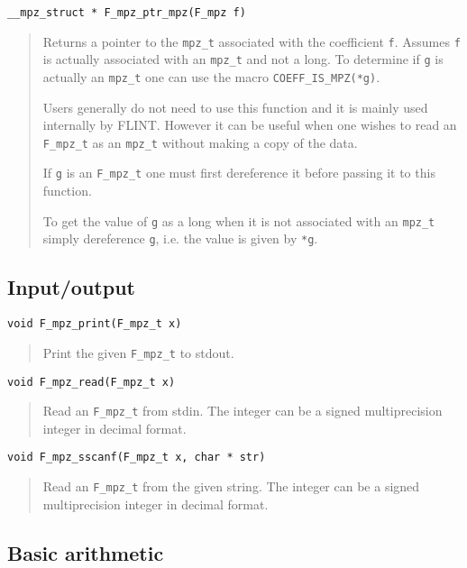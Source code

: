 \documentclass[a4paper,10pt]{article}
\newcommand{\code}{\lstinline}
\begin{document}
\begin{lstlisting}
__mpz_struct * F_mpz_ptr_mpz(F_mpz f)
\end{lstlisting}
\begin{quote}
Returns a pointer to the \code{mpz_t} associated with the coefficient \code{f}. Assumes \code{f} is actually associated with an \code{mpz_t} and not a long. To determine if \code{g} is actually an \code{mpz_t} one can use the macro \code{COEFF_IS_MPZ(*g)}.

Users generally do not need to use this function and it is mainly used internally by FLINT. However it can be useful when one wishes to read an \code{F_mpz_t} as an \code{mpz_t} without making a copy of the data. 

If \code{g} is an \code{F_mpz_t} one must first dereference it before passing it to this function. 

To get the value of \code{g} as a long when it is not associated with an \code{mpz_t} simply dereference \code{g}, i.e. the value is given by \code{*g}.
\end{quote}

\subsection{Input/output}

\begin{lstlisting}
void F_mpz_print(F_mpz_t x)
\end{lstlisting}
\begin{quote}
Print the given \code{F_mpz_t} to stdout.
\end{quote}

\begin{lstlisting}
void F_mpz_read(F_mpz_t x)
\end{lstlisting}
\begin{quote}
Read an \code{F_mpz_t} from stdin. The integer can be a signed multiprecision integer in decimal format.
\end{quote}

\begin{lstlisting}
void F_mpz_sscanf(F_mpz_t x, char * str)
\end{lstlisting}
\begin{quote}
Read an \code{F_mpz_t} from the given string. The integer can be a signed multiprecision integer in decimal format.
\end{quote}

\subsection{Basic arithmetic}
\end{document}

